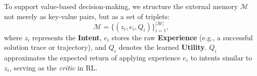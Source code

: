 \documentclass{article}
\theoremstyle{plain}
\theoremstyle{definition}
\theoremstyle{remark}
\begin{document}


To support value-based decision-making, we structure the external memory $\mathcal{M}$ not merely as key-value pairs, but as a set of triplets:
\begin{equation}
\mathcal{M}=\{(z_i, e_i, Q_i)\}_{i=1}^{|\mathcal{M}|},
\end{equation}
where $z_i$ represents the \textbf{Intent}, $e_i$ stores the raw \textbf{Experience} (e.g., a successful solution trace or trajectory), and $Q_i$ denotes the learned \textbf{Utility}. $Q_i$ approximates the expected return of applying experience $e_i$ to intents similar to $z_i$, serving as the \textit{critic} in RL.


\end{document}
